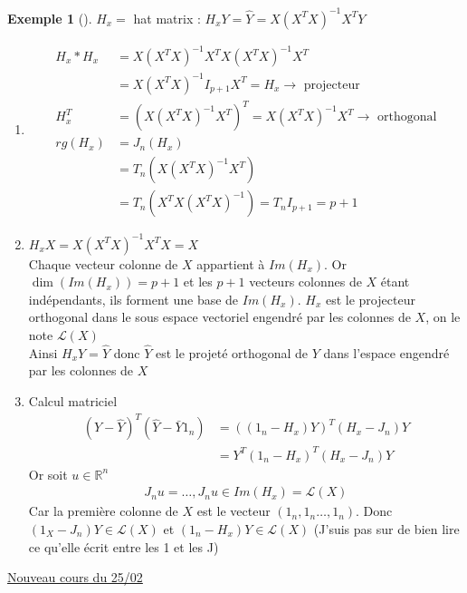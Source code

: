 \documentclass{article}
\theoremstyle{plain}%
\theoremstyle{definition}
\newtheorem{exmp}{Exemple}[section]
\theoremstyle{remark}
\begin{document}
\begin{exmp}[]
    $ H_x = $ hat matrix : $ H_x Y = \hat{Y} = X(X^TX)^{-1}X^T Y$ \begin{enumerate}
        \item \begin{align*}
            H_x * H_x &= X(X^TX)^{-1} X^T X(X^TX)^{-1} X^T \\
            &= X(X^TX)^{-1} I_{p+1} X^T = H_x \rightarrow \text{ projecteur } \\
%
            H_x^T &= (X (X^TX)^{-1} X^T)^T = X(X^TX)^{-1} X^T \rightarrow \text{ orthogonal} \\ 
%
            rg(H_x) &= J_n (H_x) \\ 
                    &= T_n ( X(X^TX)^{-1} X^T) \\
                    &= T_n (X^T X(X^TX)^{-1}) = T_n I_{p+1} = p+1
        \end{align*}
        \item $ H_x X = X (X^TX)^{-1} X^T X = X $ \\ 
        Chaque vecteur colonne de $ X $ appartient à $ Im(H_x) $. Or $ \dim (Im(H_x) ) = p+1 $ et les $ p+1 $ vecteurs colonnes de $ X $ étant indépendants, ils forment une base de $ Im(H_x) $. $ H_x $ est le projecteur orthogonal dans le sous espace vectoriel engendré par les colonnes de $ X $, on le note $ \mathcal{L}(X) $ \\ 
        Ainsi $ H_x Y = \hat{Y} $ donc $ \hat{Y} $ est le projeté orthogonal de $ Y $ dans l'espace engendré par les colonnes de $ X $ 
        \item Calcul matriciel 
        \begin{align*}
            (Y - \hat{Y})^T (\hat{Y} - \bar{Y}1_{n}) &= ( (1_{n} - H_x) Y )^T (H_x - J_n)Y \\
            &= Y^T (1_{n} - H_x)^T (H_x - J_n )Y 
        \end{align*}
        Or soit $ u \in \mathbb{R}^n $ 
        \begin{align*}
            J_n u = \dots, J_n u \in Im(H_x) = \mathcal{L}(X)
        \end{align*}
        Car la première colonne de $ X $ est le vecteur $ (1_n ,1_n \dots, 1_n) $. Donc $ (1_X - J_n)Y \in \mathcal{L}(X)$ et $ (1_n - H_x)Y \in \mathcal{L}(X) $ (J'suis pas sur de bien lire ce qu'elle écrit entre les 1 et les J)
    \end{enumerate}
\end{exmp}


\underline{Nouveau cours du 25/02} \\
\end{document}
